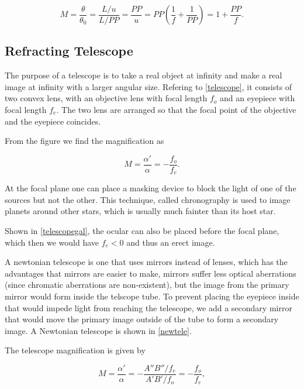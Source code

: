 \documentclass[english,a4paper,12pt]{report}
\begin{document}
\begin{equation}
    M = \frac{\theta }{\theta _{0} } = \frac{L /u}{L / PP} = \frac{PP}{u} = PP \left( \frac{1}{f} + \frac{1}{PP}   \right) = 1 + \frac{PP}{f}. 
\end{equation}

\subsection{Refracting Telescope}

The purpose of a telescope is to take a real object at infinity and make a real image at infinity with a larger angular size. Refering to \cref{telescope}, it consists of two convex lens, with an objective lens with focal length \(f_{o} \) and an eyepiece with focal length \(f_{e} \). The two lens are arranged so that the focal point of the objective and the eyepiece coincides. 


From the figure we find the magnification as 

\begin{equation}
    M = \frac{\alpha '}{\alpha } = - \frac{f_{o}  }{f_{e} }.
\end{equation}

At the focal plane one can place a masking device to block the light of one of the sources but not the other. This technique, called chronography is used to image planets around other stars, which is usually much fainter than its host star.

Shown in \cref{telescopegal}, the ocular can also be placed before the focal plane, which then we would have \(f_{e}<0 \) and thus an erect image.


A newtonian telescope is one that uses mirrors instead of lenses, which has the advantages that mirrors are easier to make, mirrors suffer less optical aberrations (since chromatic aberrations are non-existent), but the image from the primary mirror would form inside the telscope tube. To prevent placing the eyepiece inside that would impede light from reaching the telescope, we add a secondary mirror that would move the primary image outside of the tube to form a secondary image. A Newtonian telescope is shown in \cref{newtele}.

The telescope magnification is given by 

\begin{equation}
    M = \frac{\alpha '}{\alpha } = -\frac{A''B'' /f_{e} }{A'B' /f_{o} } = -\frac{f_{o} }{f_{e} },
\end{equation}
\end{document}
